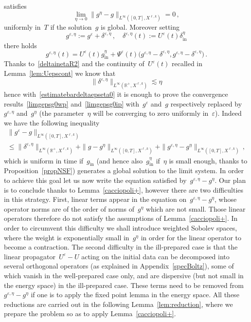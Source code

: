 \documentclass[11pt]{article}
\theoremstyle{definition}
\numberwithin{equation}{section}
\numberwithin{figure}{section}
\numberwithin{table}{section}
\newcommand*\R {\mathbb{R}}
\newcommand*\eps{{\varepsilon}}
\newcommand*\e{{\varepsilon}}
\DeclareMathOperator{\inn}{in}
\begin{document}
satisfies
\begin{equation}\label{estimatebardeltaepseta0}
\lim_{\eta\to0}\big\|g^\eta - g\big\|_{L^\infty([0,T],X^{\ell,k})}=0 \,,
\end{equation}
uniformly in~$T $ if the solution~$g$ is global. Moreover setting
\begin{equation}\label{defgepseta}
g^{\eps,\eta} :=g^\e + \delta^{\eps,\eta} \,, \quad \delta^{\eps,\eta} (t) := U^\eps(t) \delta^\eta_{\inn}
\end{equation}
there holds
\begin{equation}\label{eqgepseta}
g^{\eps,\eta}(t) =U^\eps(t) g^\eta _{\inn} + \Psi^\e(t) \big(g^{\eps,\eta}- \delta^{\eps,\eta},g^{\eps,\eta}- \delta^{\eps,\eta} \big) \,.
\end{equation}
Thanks to~\eqref{deltainetaR2} and the continuity of~$U^\eps(t) $ recalled in Lemma~\ref{lem:Uepscont} we know that
\begin{equation}\label{estimatedeltaepseta0}
\| \delta^{\eps,\eta} \|_{L^\infty(\R^+,{X}^{\ell,k})}\lesssim \eta
\end{equation}
hence with~\eqref{estimatebardeltaepseta0} it is enough to prove the convergence results~\eqref{limgepsg0wp} and~\eqref{limgepsg0ip} with~$ g^\eps $ and~$g$ respectively replaced by~$ g^{\eps,\eta} $ and~$ g^{\eta} $ (the parameter~$\eta$ will be converging to zero uniformly in~$\e$). Indeed we have the following inequality
\begin{multline*}
\|g^\eps-g\|_{L^\infty ([0,T],{X}^{\ell,k})}\\ \le \|\delta^{\eps,\eta}\|_{L^\infty (\R^+,{X}^{\ell,k})} + \|g-g^\eta\|_{L^\infty ([0,T],{X}^{\ell,k})} + \|g^{\eps,\eta}-g^\eta\|_{L^\infty ([0,T],{X}^{\ell,k})} \,,
\end{multline*}
which is uniform in time if~$ g _{\inn} $ (and hence also~$ g^\eta _{\inn} $ if~$\eta$ is small enough, thanks to Proposition~\ref{propNSF}) generates a global solution to the limit system. In order to achieve this goal let us now write the equation satisfied by~$ g^{\eps,\eta}-g^{\eta} $. Our plan is to conclude thanks to Lemma~\ref{cacciopoli+}, however there are two difficulties in this strategy. First, linear terms appear in the equation on~$ g^{\eps,\eta}-g^{\eta} $, whose operator norms are of the order of norms of~$g^\eta$ which are not small. Those linear operators therefore do not satisfy the assumptions of Lemma~\ref{cacciopoli+}. In order to circumvent this difficulty we shall introduce weighted Sobolev spaces, where the weight is exponentially small in~$g^\eta$ in order for the linear operator to become a contraction. The second difficulty in the ill-prepared case is that the linear propagator~$U^\eps-U$ acting on the initial data can be decomposed into several orthogonal operators (as explained in Appendix~\ref{specBoltz}), some of which vanish in the well-prepared case only, and are dispersive (but not small in the energy space) in the ill-prepared case. These terms need to be removed from~$ g^{\eps,\eta}-g^{\eta}$ if one is to apply the fixed point lemma in the energy space. All these reductions are carried out in the following Lemma~\ref{lem:reduction}, where we prepare the problem so as to apply Lemma~\ref{cacciopoli+}.
\end{document}
